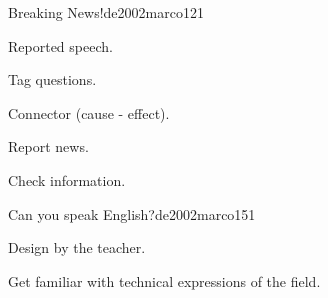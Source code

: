 \begin{syllabus}
\begin{unit}{Breaking News!}{}{de2002marco}{12}{1}
   \begin{topics}
      \item Reported speech.
      \item Tag questions.
      \item Connector (cause - effect).
   \end{topics}

   \begin{learningoutcomes}
      \item Report news.
      \item Check information.
   \end{learningoutcomes}

\end{unit}

\begin{unit}{Can you speak English?}{}{de2002marco}{15}{1}
   \begin{topics}
      \item Design by the teacher.
   \end{topics}

   \begin{learningoutcomes}
      \item Get familiar with technical expressions of the field.
   \end{learningoutcomes}
\end{unit}

\begin{coursebibliography}
\end{coursebibliography}
\end{syllabus}

